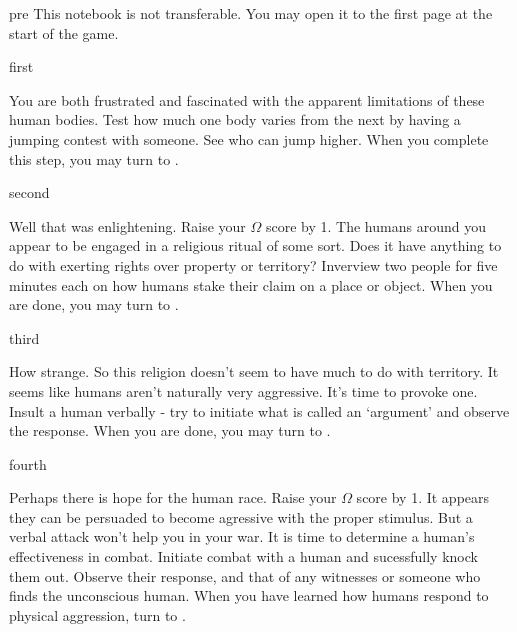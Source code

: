\documentclass[notebook]{guildcamp1}
\begin{document}

\startnotebook{\nAlienAgression{}}

\begin{page}{pre}
This notebook is not transferable. You may open it to the first page at the start of the game.
\end{page}

\begin{page}{first}

You are both frustrated and fascinated with the apparent limitations of these human bodies.  Test how much one body varies from the next by having a jumping contest with someone. See who can jump higher. When you complete this step, you may turn to .

\end{page}

\begin{page}{second}

Well that was enlightening. Raise your $\Omega$ score by 1.  The humans around you appear to be engaged in a religious ritual of some sort. Does it have anything to do with exerting rights over property or territory? Inverview two people for five minutes each on how humans stake their claim on a place or object. When you are done, you may turn to .

\end{page}

\begin{page}{third}

How strange. So this religion doesn't seem to have much to do with territory. It seems like humans aren't naturally very aggressive. It's time to provoke one. Insult a human verbally - try to initiate what is called an `argument' and observe the response. When you are done, you may turn to .

\end{page}

\begin{page}{fourth}

Perhaps there is hope for the human race.  Raise your $\Omega$ score by 1. It appears they can be persuaded to become agressive with the proper stimulus. But a verbal attack won't help you in your war. It is time to determine a human's effectiveness in combat.  Initiate combat with a  human and sucessfully knock them out. Observe their response, and that of any witnesses or someone who finds the unconscious human. When you have learned how humans respond to physical aggression, turn to .

\end{page}
\end{document}
